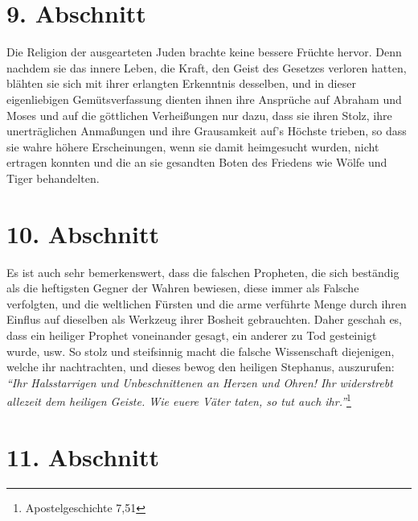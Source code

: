 \section{9. Abschnitt} \label{kap7_ab9}

Die Religion der ausgearteten Juden brachte
keine bessere Früchte hervor. Denn
nachdem sie das innere Leben, die Kraft, den Geist des
Gesetzes verloren hatten,
blähten sie sich mit ihrer erlangten Erkenntnis desselben, und in dieser
eigenliebigen Gemütsverfassung dienten ihnen ihre Ansprüche auf
Abraham und
Moses und auf die göttlichen
Verheißungen nur dazu, dass sie ihren Stolz, ihre
unerträglichen Anmaßungen und ihre
Grausamkeit auf's Höchste trieben, so dass sie
wahre höhere Erscheinungen, wenn sie damit heimgesucht
wurden, nicht ertragen
konnten und die an sie gesandten Boten des Friedens wie Wölfe und Tiger
behandelten.

\section{10. Abschnitt} \label{kap7_ab10}

Es ist auch sehr bemerkenswert, dass die falschen
Propheten, die sich beständig
als die heftigsten Gegner der Wahren bewiesen, diese immer als Falsche
verfolgten, und die weltlichen Fürsten und
die arme verführte Menge durch ihren
Einflus auf dieselben als Werkzeug ihrer Bosheit gebrauchten. Daher geschah es,
dass ein heiliger Prophet voneinander gesagt, ein anderer zu Tod gesteinigt
wurde, usw. So stolz und steifsinnig macht die falsche
Wissenschaft
diejenigen, welche ihr nachtrachten, und dieses bewog den heiligen
 Stephanus,
auszurufen:
\textit{"`Ihr Halsstarrigen und Unbeschnittenen an Herzen und Ohren! Ihr
widerstrebt allezeit dem heiligen Geiste. Wie euere Väter taten, so tut auch
ihr."'}\footnote{Apostelgeschichte 7,51}

\section{11. Abschnitt} \label{kap7_ab11}

